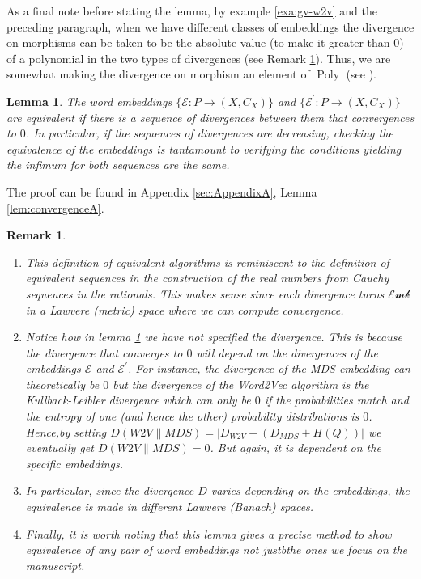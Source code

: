 \documentclass[10pt,a4paper]{elsarticle}
\newcommand{\Emb}{\mathcal{Emb}}
\newcommand{\Poly}{\operatorname{Poly}}
\newtheorem{lemma}[theorem]{Lemma}
\newtheorem{re}[theorem]{Remark}
\begin{document}
As a final note before stating the lemma, by example \ref{exa:gv-w2v} and the preceding paragraph, when we have different classes of embeddings the divergence on morphisms can be taken to be the absolute value (to make it greater than $ 0 $) of a polynomial in the two types of divergences (see Remark \ref{re:diffdiv}). Thus, we are somewhat making the divergence on morphism an element of $ \Poly $ (see \cite{niu2023polynomial}).
\
\begin{lemma}\label{lem:convergence}
	The word embeddings $\{\mathcal{E}\colon P\to(X,C_{X})\}$ and $\{\mathcal{E}^{\prime}\colon P\to(X,C_{X})\}$ are equivalent if there is a sequence of divergences between them that convergences to $0$. In particular, if the sequences of divergences are decreasing, checking the equivalence of the embeddings is tantamount to verifying the conditions yielding the infimum for both sequences are the same.
\end{lemma}

The proof can be found in Appendix \ref{sec:AppendixA}, Lemma \ref{lem:convergenceA}.

\begin{re}\label{re:diffdiv}		
	\begin{enumerate}
		\item This definition of equivalent algorithms is reminiscent to the definition of equivalent sequences in the construction of the real numbers from Cauchy sequences in the rationals. This makes sense since each divergence turns $\Emb$ in a Lawvere (metric) space where we can compute convergence. 
		
		\item Notice how in lemma \ref{lem:convergence} we have not specified the divergence. This is because the divergence that converges to $0$ will depend on the divergences of the embeddings $\mathcal{E}$ and $\mathcal{E}^{\prime}$. For instance, the divergence of the MDS embedding can theoretically be $0$ but the divergence of the Word2Vec algorithm is the Kullback-Leibler divergence which can only be $0$ if the probabilities match and the entropy of one (and hence the other) probability distributions is $0$. Hence,by setting $D(W2V \| MDS)=|D_{W2V}-(D_{MDS}+H(Q))|$ we eventually get $D(W2V \| MDS)=0$. But again, it is dependent on the specific embeddings.
		
		\item In particular, since the divergence $ D $ varies depending on the embeddings, the equivalence is made in different Lawvere (Banach) spaces. 
		
		\item  Finally, it is worth noting that this lemma gives a precise method to show equivalence of any pair of word embeddings not justbthe ones we focus on the manuscript.
		
	\end{enumerate}
\end{re}
\end{document}
